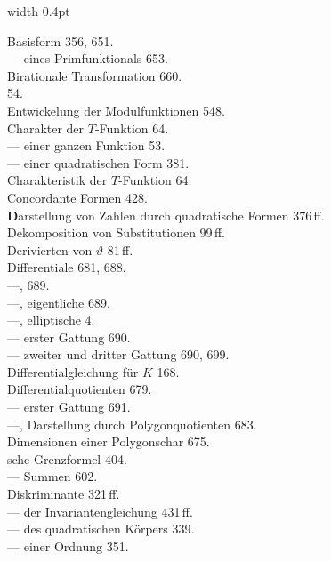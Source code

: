 \hfill\vrule width 0.4pt\hfill
\begin{minipage}[t]{0.48\textwidth}
\noindent
Basisform 356, 651. \\
--- eines Primfunktionals 653. \\
Birationale Transformation 660. \\[4pt]
 54. \\
 Entwickelung der Modulfunktionen 548. \\
Charakter der $T$-Funktion 64. \\
--- einer ganzen Funktion 53. \\
--- einer quadratischen Form 381. \\
Charakteristik der $T$-Funktion 64. \\
Concordante Formen 428. \\[4pt]
\textbf{D}arstellung von Zahlen durch quadratische Formen 376\,ff. \\
Dekomposition von Substitutionen 99\,ff. \\
Derivierten von $\vartheta$ 81\,ff. \\
Differentiale 681, 688. \\
---,  689. \\
---, eigentliche 689. \\
---, elliptische 4. \\
--- erster Gattung 690. \\
--- zweiter und dritter Gattung 690, 699. \\
Differentialgleichung für $K$ 168. \\
Differentialquotienten 679. \\
--- erster Gattung 691. \\
---, Darstellung durch Polygonquotienten 683. \\
Dimensionen einer Polygonschar 675. \\
sche Grenzformel 404. \\
--- Summen 602. \\
Diskriminante 321\,ff. \\
--- der Invariantengleichung 431\,ff. \\
--- des quadratischen Körpers 339. \\
--- einer Ordnung 351.
\end{minipage}

